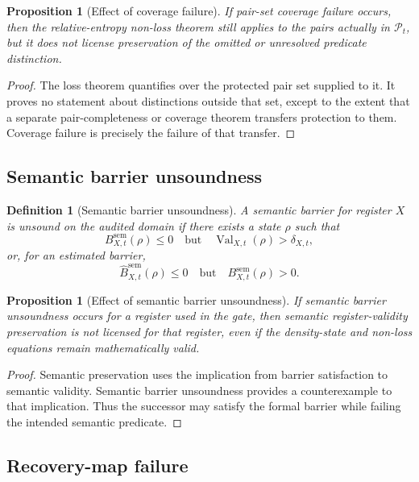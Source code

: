 \documentclass[11pt]{article}
\newtheorem{proposition}[theorem]{Proposition}
\newtheorem{definition}[theorem]{Definition}
\newcommand{\Pcal}{\mathcal{P}}
\newcommand{\1}{\mathbf{1}}
\newcommand{\Val}{\operatorname{Val}}
\providecommand{\sem}{\mathrm{sem}}
\begin{document}
\begin{proposition}[Effect of coverage failure]
If pair-set coverage failure occurs, then the relative-entropy non-loss theorem still applies to the pairs actually in \(\Pcal_t\), but it does not license preservation of the omitted or unresolved predicate distinction.
\end{proposition}

\begin{proof}
The loss theorem quantifies over the protected pair set supplied to it. It proves no statement about distinctions outside that set, except to the extent that a separate pair-completeness or coverage theorem transfers protection to them. Coverage failure is precisely the failure of that transfer.
\end{proof}

\subsection{Semantic barrier unsoundness}

\begin{definition}[Semantic barrier unsoundness]
A semantic barrier for register \(X\) is unsound on the audited domain if there exists a state \(\rho\) such that
\[
B^{\sem}_{X,t}(\rho)\le0
\quad\text{but}\quad
\Val_{X,t}(\rho)>\delta_{X,t},
\]
or, for an estimated barrier,
\[
\widehat B^{\sem}_{X,t}(\rho)\le0
\quad\text{but}\quad
B^{\sem}_{X,t}(\rho)>0.
\]
\end{definition}

\begin{proposition}[Effect of semantic barrier unsoundness]
If semantic barrier unsoundness occurs for a register used in the gate, then semantic register-validity preservation is not licensed for that register, even if the density-state and non-loss equations remain mathematically valid.
\end{proposition}

\begin{proof}
Semantic preservation uses the implication from barrier satisfaction to semantic validity. Semantic barrier unsoundness provides a counterexample to that implication. Thus the successor may satisfy the formal barrier while failing the intended semantic predicate.
\end{proof}

\subsection{Recovery-map failure}
\end{document}
